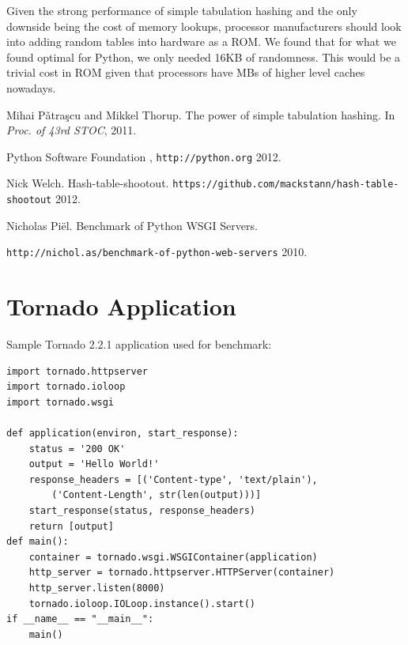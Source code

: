 \documentclass[11pt]{article}
\begin{document}
Given the strong performance of simple tabulation hashing and the only downside
being the cost of memory lookups, processor manufacturers should look into
adding random tables into hardware as a ROM.  We found that for what we found
optimal for Python, we only needed 16KB of randomness.  This would be a trivial
cost in ROM given that processors have MBs of higher level caches nowadays.

\begin{thebibliography}{10}

 Mihai P\v{a}tra\c{s}cu and Mikkel Thorup. The power of simple tabulation hashing. In \emph{Proc. of 43rd STOC}, 2011.

 Python Software Foundation \emph{},
\texttt{http://python.org} 2012.

 Nick Welch. Hash-table-shootout. 
\texttt{https://github.com/mackstann/hash-table-shootout} 2012.


 Nicholas Piël. Benchmark of Python WSGI Servers. 

\texttt{http://nichol.as/benchmark-of-python-web-servers} 2010.


\end{thebibliography}
\appendix
\newpage
{}
\section{Tornado Application}
Sample Tornado 2.2.1 application used for benchmark:
 \begin{verbatim}
import tornado.httpserver
import tornado.ioloop
import tornado.wsgi

def application(environ, start_response):
    status = '200 OK'
    output = 'Hello World!' 
    response_headers = [('Content-type', 'text/plain'),
        ('Content-Length', str(len(output)))]
    start_response(status, response_headers)
    return [output]
def main():
    container = tornado.wsgi.WSGIContainer(application)
    http_server = tornado.httpserver.HTTPServer(container)
    http_server.listen(8000)
    tornado.ioloop.IOLoop.instance().start()
if __name__ == "__main__":
    main()
 \end{verbatim}
\appendix
\end{document}
